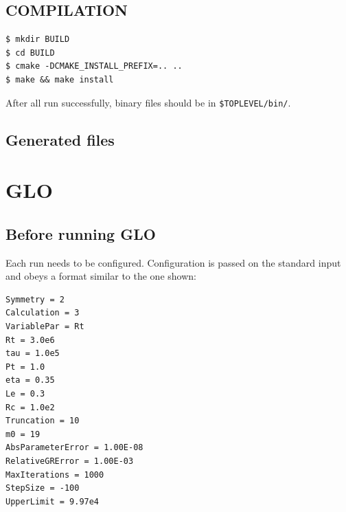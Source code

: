 \documentclass[a4paper,10pt]{book}
\begin{document}
\subsection{COMPILATION}
\begin{verbatim}
$ mkdir BUILD
$ cd BUILD
$ cmake -DCMAKE_INSTALL_PREFIX=.. ..
$ make && make install
\end{verbatim}
After all run successfully, binary files should be in \verb|$TOPLEVEL/bin/|.

\subsection{Generated files}


\section{GLO}
\subsection{Before running GLO}
\label{s:runConfig}
Each run needs to be configured. Configuration is passed on the standard input
and obeys a format similar to the one shown:
\begin{verbatim}
Symmetry = 2
Calculation = 3
VariablePar = Rt
Rt = 3.0e6 
tau = 1.0e5 
Pt = 1.0 
eta = 0.35 
Le = 0.3 
Rc = 1.0e2
Truncation = 10 
m0 = 19
AbsParameterError = 1.00E-08 
RelativeGRError = 1.00E-03 
MaxIterations = 1000
StepSize = -100 
UpperLimit = 9.97e4
\end{verbatim}
\end{document}
